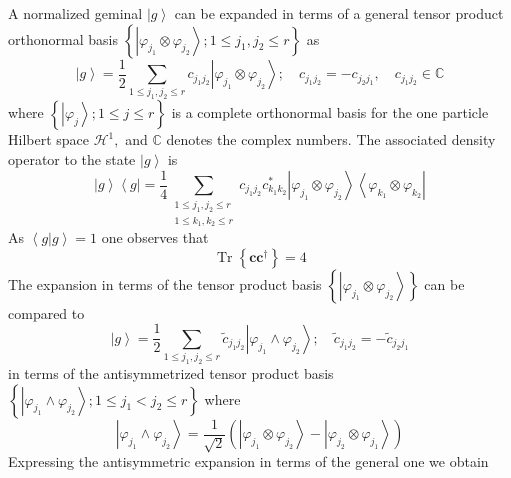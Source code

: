 \documentclass[aps,preprint]{revtex4}%
\begin{document}
A normalized geminal $\left\vert g\right\rangle $ can be expanded in terms of
a general tensor product orthonormal basis $\left\{  \left\vert \varphi
_{j_{1}}\otimes\varphi_{j_{2}}\right\rangle ;1\leq j_{1},j_{2}\leq r\right\}
$ as
\begin{equation}
\left\vert g\right\rangle =\frac{1}{2}\sum_{1\leq j_{1},j_{2}\leq r}%
c_{j_{1}j_{2}}\left\vert \varphi_{j_{1}}\otimes\varphi_{j_{2}}\right\rangle
;\quad c_{j_{1}j_{2}}=-c_{j_{2}j_{1}},\quad c_{j_{1}j_{2}}\in\mathbb{C}%
\end{equation}
where $\left\{  \left\vert \varphi_{j}\right\rangle ;1\leq j\leq r\right\}  $
is a complete orthonormal basis for the one particle Hilbert space
$\mathcal{H}^{1},$ and $\mathbb{C}$ denotes the complex numbers. The
associated density operator to the state $\left\vert g\right\rangle $ is
\begin{equation}
\left\vert g\right\rangle \left\langle g\right\vert =\frac{1}{4}%
\sum_{\substack{1\leq j_{1},j_{2}\leq r\\1\leq k_{1},k_{2}\leq r}%
}c_{j_{1}j_{2}}c_{k_{1}k_{2}}^{\ast}\left\vert \varphi_{j_{1}}\otimes
\varphi_{j_{2}}\right\rangle \left\langle \varphi_{k_{1}}\otimes\varphi
_{k_{2}}\right\vert
\end{equation}
As $\left\langle g|g\right\rangle =1$ one observes that
\begin{equation}
\operatorname{Tr}\left\{  \mathbf{cc}^{\dagger}\right\}  =4
\end{equation}
The expansion in terms of the tensor product basis $\left\{  \left\vert
\varphi_{j_{1}}\otimes\varphi_{j_{2}}\right\rangle \right\}  $ can be compared
to
\begin{equation}
\left\vert g\right\rangle =\frac{1}{2}\sum_{1\leq j_{1},j_{2}\leq r}\tilde
{c}_{j_{1}j_{2}}\left\vert \varphi_{j_{1}}\wedge\varphi_{j_{2}}\right\rangle
;\quad\tilde{c}_{j_{1}j_{2}}=-\tilde{c}_{j_{2}j_{1}}%
\end{equation}
in terms of the antisymmetrized tensor product basis $\left\{  \left\vert
\varphi_{j_{1}}\wedge\varphi_{j_{2}}\right\rangle ;1\leq j_{1}<j_{2}\leq
r\right\}  $ where
\begin{equation}
\left\vert \varphi_{j_{1}}\wedge\varphi_{j_{2}}\right\rangle =\frac{1}%
{\sqrt{2}}\left(  \left\vert \varphi_{j_{1}}\otimes\varphi_{j_{2}%
}\right\rangle -\left\vert \varphi_{j_{2}}\otimes\varphi_{j_{1}}\right\rangle
\right)
\end{equation}
Expressing the antisymmetric expansion in terms of the general one we obtain
\end{document}
